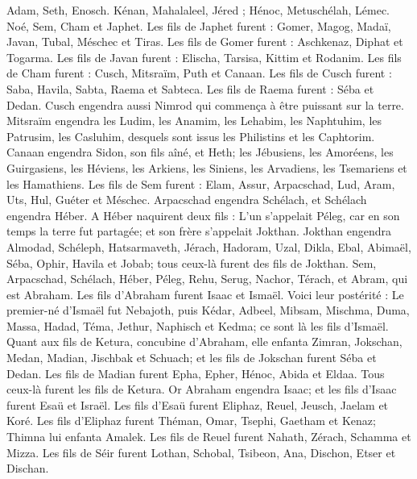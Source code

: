 \begin{multicols}{2}
\VerseOne{}Adam, Seth, Enosch.
Kénan, Mahalaleel, Jéred ;
Hénoc, Metuschélah, Lémec.
Noé, Sem, Cham et Japhet.
Les fils de Japhet furent : Gomer, Magog, Madaï, Javan, Tubal, Méschec et Tiras.
Les fils de Gomer furent : Aschkenaz, Diphat et Togarma.
Les fils de Javan furent : Elischa, Tarsisa, Kittim et Rodanim.
Les fils de Cham furent : Cusch, Mitsraïm, Puth et Canaan.
Les fils de Cusch furent  : Saba, Havila, Sabta, Raema et Sabteca. Les fils de Raema furent : Séba et Dedan.
Cusch engendra aussi Nimrod qui commença à être puissant sur la terre.
Mitsraïm engendra les Ludim, les Anamim, les Lehabim, les Naphtuhim,
les Patrusim, les Casluhim, desquels sont issus les Philistins et les Caphtorim.
Canaan engendra Sidon, son fils aîné, et Heth;
les Jébusiens, les Amoréens, les Guirgasiens,
les Héviens, les Arkiens, les Siniens,
les Arvadiens, les Tsemariens et les Hamathiens.
Les fils de Sem furent : Elam, Assur, Arpacschad, Lud, Aram, Uts, Hul, Guéter et Méschec.
Arpacschad engendra Schélach, et Schélach engendra Héber.
A Héber naquirent deux fils : L'un s'appelait Péleg, car en son temps la terre fut partagée; et son frère s’appelait Jokthan.
Jokthan engendra Almodad, Schéleph, Hatsarmaveth, Jérach,
Hadoram, Uzal, Dikla,
Ebal, Abimaël, Séba,
Ophir, Havila et Jobab; tous ceux-là furent des fils de Jokthan.
Sem, Arpacschad, Schélach,
Héber, Péleg, Rehu,
Serug, Nachor, Térach,
et Abram, qui est Abraham.
Les fils d’Abraham furent  Isaac et Ismaël.
Voici leur postérité : Le premier-né d'Ismaël fut Nebajoth, puis Kédar, Adbeel, Mibsam,
Mischma, Duma, Massa, Hadad, Téma,
Jethur, Naphisch et Kedma; ce sont là les fils d'Ismaël.
Quant aux fils de Ketura, concubine d'Abraham, elle enfanta Zimran, Jokschan, Medan, Madian, Jischbak et Schuach; et les fils de Jokschan furent Séba et Dedan.
Les fils de Madian furent  Epha, Epher, Hénoc, Abida et Eldaa. Tous ceux-là furent les fils de Ketura.
Or Abraham engendra Isaac; et les fils d'Isaac furent  Esaü et Israël.
Les fils d’Esaü furent  Eliphaz, Reuel, Jeusch, Jaelam et Koré.
Les fils d’Eliphaz furent Théman, Omar, Tsephi, Gaetham et Kenaz; Thimna lui enfanta Amalek.
Les fils de Reuel furent Nahath, Zérach, Schamma et Mizza.
Les fils de Séir furent Lothan, Schobal, Tsibeon, Ana, Dischon, Etser et Dischan.

\end{multicols}
